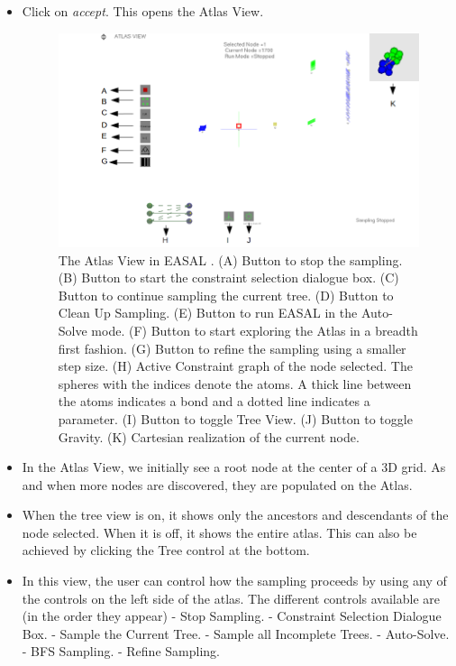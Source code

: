\documentclass[10pt]{article}
\begin{document}
\begin{itemize}
\item Click on \emph{accept}. This opens the Atlas View.

\begin{figure}[h]
	\centering
	\includegraphics[scale=0.5] {fig/AtlasView.png}
	\caption{The Atlas View in EASAL . (A) Button to stop the sampling. (B) Button
to start the constraint selection dialogue box. (C) Button to continue sampling
the current tree. (D) Button to Clean Up Sampling. (E) Button to run EASAL in
the Auto-Solve mode. (F) Button to start exploring the Atlas in a breadth first
fashion. (G) Button to refine the sampling using a smaller step size. (H)
Active Constraint graph of the node selected. The spheres with the indices
denote the atoms. A thick line between the atoms indicates a bond and a dotted
line indicates a parameter. (I) Button to toggle Tree View. (J) Button to
toggle Gravity. (K) Cartesian realization of the current node.}
\label{atlasview}
\end{figure}

\item In the Atlas View, we initially see a root node at the center of a 3D
		grid. As and when more nodes are discovered, they are populated on the
		Atlas.

\item When the tree view is on, it shows only the ancestors and descendants of
		the node selected. When it is off, it shows the entire atlas. This can
		also be achieved by clicking the Tree control at the bottom.

\item In this view, the user can control how the sampling proceeds by using any
		of the controls on the left side of the atlas. The different controls
		available are (in the order they appear)
    - Stop Sampling.
    - Constraint Selection Dialogue Box.
    - Sample the Current Tree.
	- Sample all Incomplete Trees.
	- Auto-Solve.
    - BFS Sampling.
    - Refine Sampling.


\end{itemize}
\end{document}
